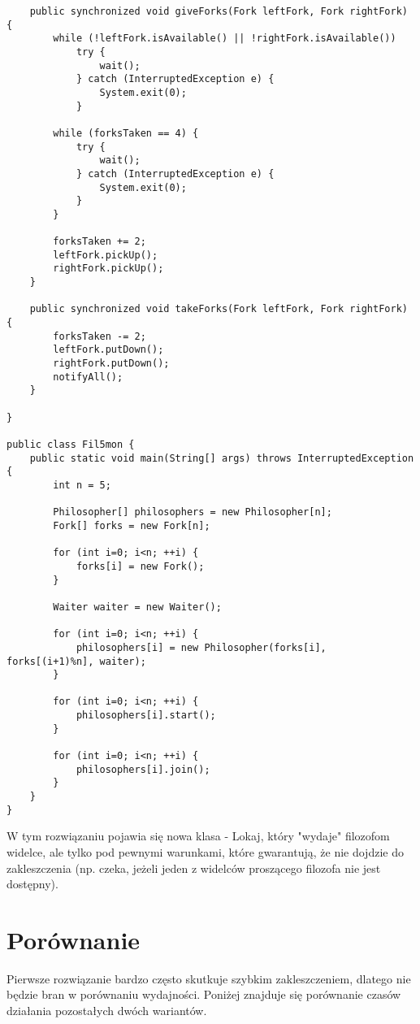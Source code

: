 \documentclass{article}
\begin{document}
\begin{verbatim}
    public synchronized void giveForks(Fork leftFork, Fork rightFork) {
        while (!leftFork.isAvailable() || !rightFork.isAvailable()) 
            try {
                wait();
            } catch (InterruptedException e) {
                System.exit(0);
            }

        while (forksTaken == 4) {
            try {
                wait();
            } catch (InterruptedException e) {
                System.exit(0);
            }
        }

        forksTaken += 2;
        leftFork.pickUp();
        rightFork.pickUp();
    }

    public synchronized void takeForks(Fork leftFork, Fork rightFork) {
        forksTaken -= 2;
        leftFork.putDown();
        rightFork.putDown();
        notifyAll();
    }

}
    
public class Fil5mon {
    public static void main(String[] args) throws InterruptedException {
        int n = 5;

        Philosopher[] philosophers = new Philosopher[n];
        Fork[] forks = new Fork[n];

        for (int i=0; i<n; ++i) {
            forks[i] = new Fork();
        }

        Waiter waiter = new Waiter();

        for (int i=0; i<n; ++i) {
            philosophers[i] = new Philosopher(forks[i], forks[(i+1)%n], waiter);
        }

        for (int i=0; i<n; ++i) {
            philosophers[i].start();
        }

        for (int i=0; i<n; ++i) {
            philosophers[i].join();
        }
    }
}
\end{verbatim}

W tym rozwiązaniu pojawia się nowa klasa - Lokaj, który "wydaje" filozofom widelce, ale tylko pod pewnymi
warunkami, które gwarantują, że nie dojdzie do zakleszczenia (np. czeka, jeżeli jeden z widelców proszącego
filozofa nie jest dostępny).

\section{Porównanie}

Pierwsze rozwiązanie bardzo często skutkuje szybkim zakleszczeniem, dlatego nie będzie bran w porównaniu
wydajności. Poniżej znajduje się porównanie czasów działania pozostałych dwóch wariantów.
\end{document}
